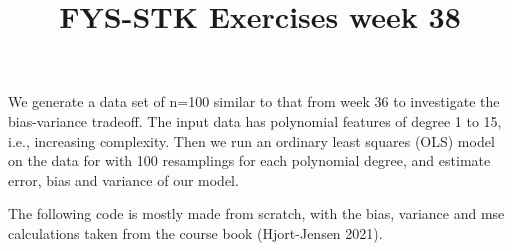 \documentclass[
  letterpaper,
  DIV=11,
  numbers=noendperiod]{scrartcl}
\title{FYS-STK Exercises week 38}
\author{}
\date{}
\begin{document}
\maketitle
\ifdefined\Shaded\renewenvironment{Shaded}{\begin{tcolorbox}[enhanced, sharp corners, breakable, frame hidden, interior hidden, borderline west={3pt}{0pt}{shadecolor}, boxrule=0pt]}{\end{tcolorbox}}\fi

We generate a data set of n=100 similar to that from week 36 to
investigate the bias-variance tradeoff. The input data has polynomial
features of degree 1 to 15, i.e., increasing complexity. Then we run an
ordinary least squares (OLS) model on the data for with 100 resamplings
for each polynomial degree, and estimate error, bias and variance of our
model.

The following code is mostly made from scratch, with the bias, variance
and mse calculations taken from the course book (Hjort-Jensen 2021).
\end{document}
